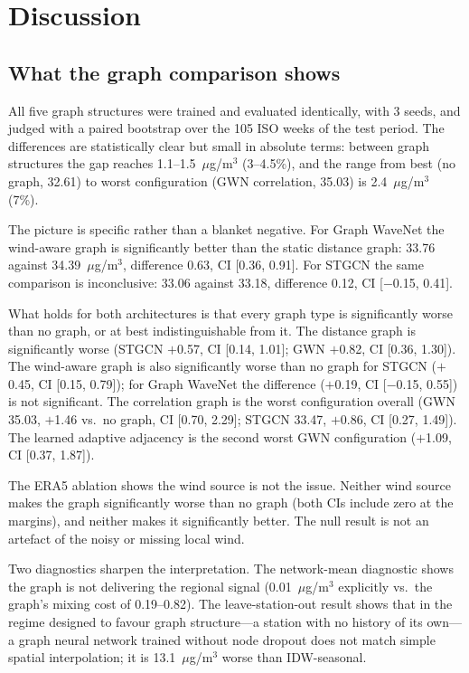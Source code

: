 \documentclass[11pt,a4paper]{article}
\begin{document}
\section{Discussion}

\subsection{What the graph comparison shows}

All five graph structures were trained and evaluated identically, with 3 seeds,
and judged with a paired bootstrap over the 105 ISO weeks of the test period.
The differences are statistically clear but small in absolute terms:
between graph structures the gap reaches 1.1--1.5~$\mu$g/m$^3$ (3--4.5\%),
and the range from best (no graph, 32.61) to worst configuration
(GWN correlation, 35.03) is 2.4~$\mu$g/m$^3$ (7\%).

The picture is specific rather than a blanket negative.  For Graph WaveNet
the wind-aware graph is significantly better than the static distance graph:
33.76 against 34.39~$\mu$g/m$^3$, difference 0.63, CI [0.36, 0.91].
For STGCN the same comparison is inconclusive: 33.06 against 33.18, difference
0.12, CI [$-$0.15, 0.41].

What holds for both architectures is that every graph type is significantly
worse than no graph, or at best indistinguishable from it.  The distance graph
is significantly worse (STGCN $+$0.57, CI [0.14, 1.01]; GWN $+$0.82,
CI [0.36, 1.30]).  The wind-aware graph is also significantly worse than no
graph for STGCN ($+$0.45, CI [0.15, 0.79]); for Graph WaveNet the difference
($+$0.19, CI [$-$0.15, 0.55]) is not significant.  The correlation graph is the
worst configuration overall (GWN 35.03, $+$1.46 vs.\ no graph, CI [0.70, 2.29];
STGCN 33.47, $+$0.86, CI [0.27, 1.49]).  The learned adaptive adjacency is the
second worst GWN configuration ($+$1.09, CI [0.37, 1.87]).

The ERA5 ablation shows the wind source is not the issue.  Neither wind source
makes the graph significantly worse than no graph (both CIs include zero at the
margins), and neither makes it significantly better.  The null result is not an
artefact of the noisy or missing local wind.

Two diagnostics sharpen the interpretation.  The network-mean diagnostic shows
the graph is not delivering the regional signal (0.01~$\mu$g/m$^3$ explicitly
vs.\ the graph's mixing cost of 0.19--0.82).  The leave-station-out result
shows that in the regime designed to favour graph structure---a station with no
history of its own---a graph neural network trained without node dropout does
not match simple spatial interpolation; it is 13.1~$\mu$g/m$^3$ worse than
IDW-seasonal.
\end{document}
